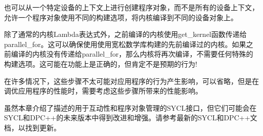 也可以从一个特定设备的上下文上进行创建程序对象，而不是所有的设备上下文，允许一个程序对象使用不同的构建选项，将内核编译到不同的设备对象上。\par

除了通常的内核Lambda表达式外，之前编译的内核使用get\_kernel函数传递给parallel\_for。这可以确保使用使用宽松数学库构建的先前编译过的内核。如果之前编译的内核没有传递给parallel\_for，那么内核将再次编译，不需要任何特殊的构建选项。这可能在功能上是正确的，但肯定不是预期的行为!\par

在许多情况下，这些步骤不太可能对应用程序的行为产生影响，可以省略，但是在调优应用程序的性能时，需要考虑这些步骤所带来的性能影响。\par

\begin{tcolorbox}[colback=blue!5!white,colframe=blue!75!black, title=改进互动性和程序对象管理]
虽然本章介绍了描述的用于互动性和程序对象管理的SYCL接口，但它们可能会在SYCL和DPC++的未来版本中得到改进和增强。请参考最新的SYCL和DPC++文档，以找到更新。
\end{tcolorbox}






































